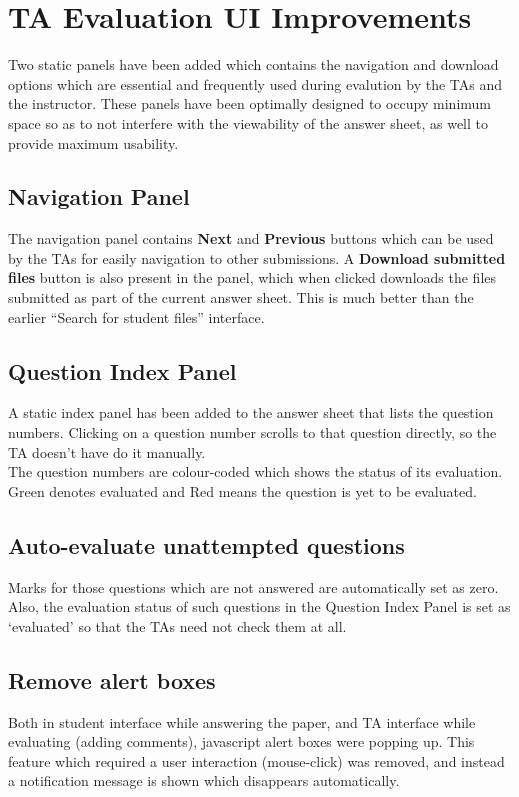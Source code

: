 \section{TA Evaluation UI Improvements}

Two static panels have been added which contains the navigation and download options which are essential and frequently used during evalution by the TAs and the instructor. These panels have been optimally designed to occupy minimum space so as to not interfere with the viewability of the answer sheet, as well to provide maximum usability.

\subsection{Navigation Panel}
The navigation panel contains \textbf{Next} and \textbf{Previous} buttons which can be used by the TAs for easily navigation to other submissions. A \textbf{Download submitted files} button is also present in the panel, which when clicked downloads the files submitted as part of the current answer sheet. This is much better than the earlier ``Search for student files'' interface.

\subsection{Question Index Panel}
A static index panel has been added to the answer sheet that lists the question numbers. Clicking on a question number scrolls to that question directly, so the TA doesn't have do it manually.\\
The question numbers are colour-coded which shows the status of its evaluation. Green denotes evaluated and Red means the question is yet to be evaluated.

\subsection{Auto-evaluate unattempted questions}
Marks for those questions which are not answered are automatically set as zero. Also, the evaluation status of such questions in the Question Index Panel is set as `evaluated' so that the TAs need not check them at all.

\subsection{Remove alert boxes}
Both in student interface while answering the paper, and TA interface while evaluating (adding comments), javascript alert boxes were popping up. This feature which required a user interaction (mouse-click) was removed, and instead a notification message is shown which disappears automatically.
